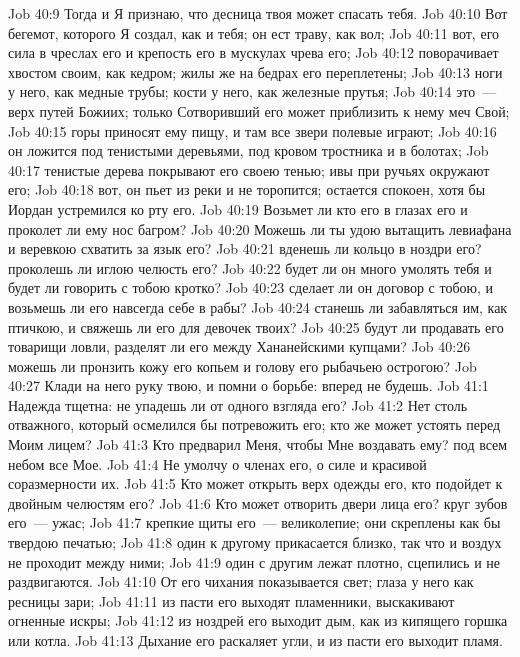 \vs Job 40:9 Тогда и Я признаю, что десница твоя может спасать тебя.
\vs Job 40:10 Вот бегемот, которого Я создал, как и тебя; он ест траву, как вол;
\vs Job 40:11 вот, его сила в чреслах его и крепость его в мускулах чрева его;
\vs Job 40:12 поворачивает хвостом своим, как кедром; жилы же на бедрах его переплетены;
\vs Job 40:13 ноги у него, как медные трубы; кости у него, как железные прутья;
\vs Job 40:14 это~--- верх путей Божиих; только Сотворивший его может приблизить к нему меч Свой;
\vs Job 40:15 горы приносят ему пищу, и там все звери полевые играют;
\vs Job 40:16 он ложится под тенистыми деревьями, под кровом тростника и в болотах;
\vs Job 40:17 тенистые дерева покрывают его своею тенью; ивы при ручьях окружают его;
\vs Job 40:18 вот, он пьет из реки и не торопится; остается спокоен, хотя бы Иордан устремился ко рту его.
\vs Job 40:19 Возьмет ли кто его в глазах его и проколет ли ему нос багром?
\vs Job 40:20 Можешь ли ты удою вытащить левиафана и веревкою схватить за язык его?
\vs Job 40:21 вденешь ли кольцо в ноздри его? проколешь ли иглою челюсть его?
\vs Job 40:22 будет ли он много умолять тебя и будет ли говорить с тобою кротко?
\vs Job 40:23 сделает ли он договор с тобою, и возьмешь ли его навсегда себе в рабы?
\vs Job 40:24 станешь ли забавляться им, как птичкою, и свяжешь ли его для девочек твоих?
\vs Job 40:25 будут ли продавать его товарищи ловли, разделят ли его между Хананейскими купцами?
\vs Job 40:26 можешь ли пронзить кожу его копьем и голову его рыбачьею острогою?
\vs Job 40:27 Клади на него руку твою, и помни о борьбе: вперед не будешь.
\vs Job 41:1 Надежда тщетна: не упадешь ли от одного взгляда его?
\vs Job 41:2 Нет столь отважного, который осмелился бы потревожить его; кто же может устоять перед Моим лицем?
\vs Job 41:3 Кто предварил Меня, чтобы Мне воздавать ему? под всем небом все Мое.
\vs Job 41:4 Не умолчу о членах его, о силе и красивой соразмерности их.
\vs Job 41:5 Кто может открыть верх одежды его, кто подойдет к двойным челюстям его?
\vs Job 41:6 Кто может отворить двери лица его? круг зубов его~--- ужас;
\vs Job 41:7 крепкие щиты его~--- великолепие; они скреплены как бы твердою печатью;
\vs Job 41:8 один к другому прикасается близко, так что и воздух не проходит между ними;
\vs Job 41:9 один с другим лежат плотно, сцепились и не раздвигаются.
\vs Job 41:10 От его чихания показывается свет; глаза у него как ресницы зари;
\vs Job 41:11 из пасти его выходят пламенники, выскакивают огненные искры;
\vs Job 41:12 из ноздрей его выходит дым, как из кипящего горшка или котла.
\vs Job 41:13 Дыхание его раскаляет угли, и из пасти его выходит пламя.
